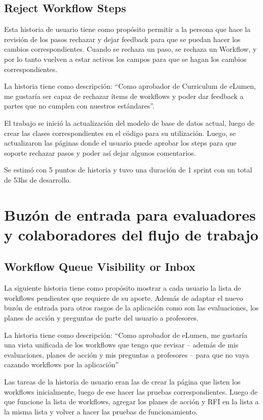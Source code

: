 \subsection{Reject Workflow Steps}
Esta historia de usuario tiene como propósito permitir a la persona que hace la revisión de los pasos rechazar y dejar feedback para que se puedan hacer los cambios correspondientes. Cuando se rechaza un paso, se rechaza un Workflow, y por lo tanto vuelven a estar activos los campos para que se hagan los cambios correspondientes.

La historia tiene como descripción: “Como aprobador de Curriculum de eLumen, me gustaría ser capaz de rechazar ítems de workflows y poder dar feedback a partes que no cumplen con nuestros estándares”.

El trabajo se inició la actualización del modelo de base de datos actual, luego de crear las clases correspondientes en el código para su utilización. Luego, se actualizaron las páginas donde el usuario puede aprobar los steps para que soporte rechazar pasos y poder así dejar algunos comentarios. 

Se estimó con 5 puntos de historia y tuvo una duración de 1 sprint con un total de 53hs de desarrollo.

\section{Buzón de entrada para evaluadores y colaboradores del flujo de trabajo}
\subsection{Workflow Queue Visibility or Inbox}
La siguiente historia tiene como propósito mostrar a cada usuario la lista de workflows pendientes que requiere de su aporte. Además de adaptar el nuevo buzón de entrada para otros rasgos de la aplicación como son las evaluaciones, los planes de acción y preguntas de parte del usuario a profesores.

La historia tiene como descripción: “Como aprobador de eLumen, me gustaría una vista unificada de los workflows que tengo que revisar – además de mis evaluaciones, planes de acción y mis preguntas a profesores – para que no vaya cazando workflows por la aplicación”

Las tareas de la historia de usuario eran las de crear la página que listen los workflows inicialmente, luego de ese hacer las pruebas correspondientes. Luego de que funcione la lista de workflows, agregar los planes de acción y RFI en la lista a la misma lista y volver a hacer las pruebas de funcionamiento. 

